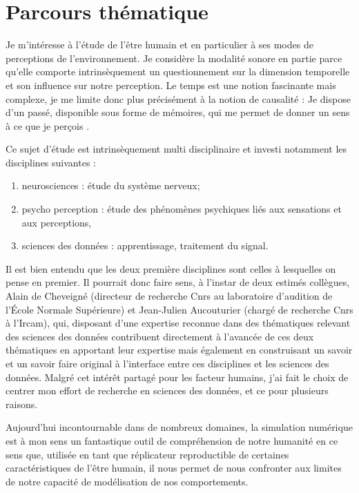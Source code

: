 \chapter{\nmu Parcours  thématique} \label{chap:themes}

Je m'intéresse à l'étude de l'être humain et en particulier à ses modes de perceptions de l'environnement. Je considère la modalité sonore en partie parce qu'elle comporte intrinsèquement un questionnement sur la dimension temporelle et son influence sur notre perception. Le temps est une notion fascinante mais complexe, je me limite donc plus précisément à la notion de causalité : \og Je dispose d'un passé, disponible sous forme de mémoires, qui me permet de donner un sens à ce que je perçois \fg.


Ce sujet d'étude est intrinsèquement multi disciplinaire et investi notamment les disciplines suivantes :
\begin{enumerate}
  \item neurosciences : étude du système nerveux;
  \item psycho perception : étude des phénomènes psychiques liés aux sensations et aux perceptions,
  \item sciences des données : apprentissage, traitement du signal.
\end{enumerate}

Il est bien entendu que les deux première disciplines sont  celles à lesquelles on pense en premier. Il pourrait donc faire sens, à l'instar de deux estimés collègues, Alain de Cheveigné (directeur de recherche Cnrs au laboratoire d'audition de l'\'Ecole Normale Supérieure) et Jean-Julien Aucouturier (chargé de recherche Cnrs à l'Ircam), qui, disposant d'une expertise reconnue dans des thématiques relevant des sciences des données contribuent directement à l'avancée de ces deux thématiques en apportant leur expertise mais également en construisant un savoir et un savoir faire original à l'interface entre ces disciplines et les sciences des données. Malgré cet intérêt partagé pour les facteur humains, j'ai fait le choix de centrer mon effort de recherche en sciences des données, et ce pour plusieurs raisons.

Aujourd'hui incontournable dans de nombreux domaines, la simulation numérique est à mon sens un fantastique outil de compréhension de notre humanité en ce sens que, utilisée en tant que \og réplicateur reproductible \fg de certaines caractéristiques de l'être humain, il nous permet de nous confronter aux limites de notre capacité de modélisation de nos comportements.

